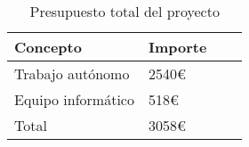 \begin{table}[!ht]
    \begin{center}
    \begin{tabular}{|p{60mm}|p{20mm}|p{40mm}|p{25mm}|} \hline 
    \textbf{Concepto} & \textbf{Importe} \\ \hline
    Trabajo autónomo & 2540\euro \\ \hline

    Equipo informático & 518\euro \\ \hline
    
    Total & 3058\euro \\ \hline
    
    \end{tabular}
    \end{center}
    \caption{Presupuesto total del proyecto}
    \label{table:resOthers}
    \end{table}